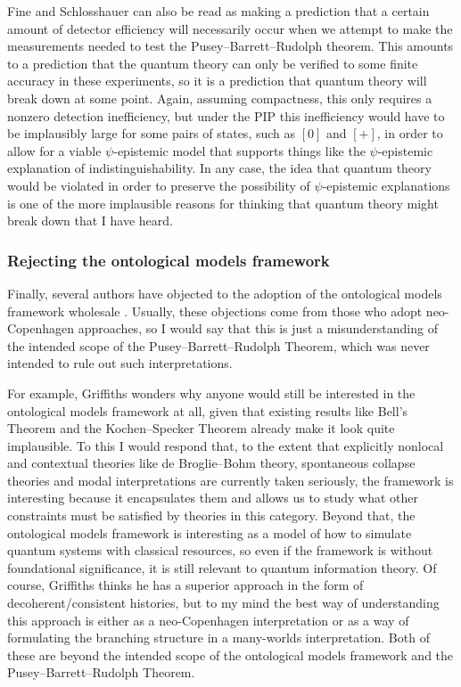 \documentclass[DIV=calc,paper=a4,fontsize=11pt,twocolumn]{scrartcl} %
\theoremstyle{definition}
\theoremstyle{plain}
\newcommand{\Proj}[1]{\ensuremath{\left [ #1 \right ]}}
\begin{document}
Fine and Schlosshauer can also be read as making a prediction that a
certain amount of detector efficiency will necessarily occur when we
attempt to make the measurements needed to test the Pusey--Barrett--Rudolph theorem.  This
amounts to a prediction that the quantum theory can only be verified
to some finite accuracy in these experiments, so it is a prediction
that quantum theory will break down at some point.  Again, assuming
compactness, this only requires a nonzero detection inefficiency, but
under the PIP this inefficiency would have to be implausibly large for
some pairs of states, such as $\Proj{0}$ and $\Proj{+}$, in order to
allow for a viable $\psi$-epistemic model that supports things like
the $\psi$-epistemic explanation of indistinguishability.  In any
case, the idea that quantum theory would be violated in order to
preserve the possibility of $\psi$-epistemic explanations is one of
the more implausible reasons for thinking that quantum theory might
break down that I have heard.


\subsubsection{Rejecting the ontological models framework}

\label{Crit:Copenhagen}

Finally, several authors have objected to the adoption of the
ontological models framework wholesale \cite{Hofmann2011, Motl2011,
Griffiths2012}.  Usually, these objections come from those who adopt
neo-Copenhagen approaches, so I would say that this is just a
misunderstanding of the intended scope of the Pusey--Barrett--Rudolph Theorem, which was
never intended to rule out such interpretations.

For example, Griffiths \cite{Griffiths2012} wonders why anyone would
still be interested in the ontological models framework at all, given
that existing results like Bell's Theorem and the Kochen--Specker
Theorem already make it look quite implausible.  To this I would
respond that, to the extent that explicitly nonlocal and contextual
theories like de Broglie--Bohm theory, spontaneous collapse theories
and modal interpretations are currently taken seriously, the framework
is interesting because it encapsulates them and allows us to study
what other constraints must be satisfied by theories in this category.
Beyond that, the ontological models framework is interesting as a
model of how to simulate quantum systems with classical resources, so
even if the framework is without foundational significance, it is
still relevant to quantum information theory.  Of course, Griffiths
thinks he has a superior approach in the form of decoherent/consistent
histories, but to my mind the best way of understanding this approach
is either as a neo-Copenhagen interpretation or as a way of
formulating the branching structure in a many-worlds interpretation.
Both of these are beyond the intended scope of the ontological models
framework and the Pusey--Barrett--Rudolph Theorem.
\end{document}
